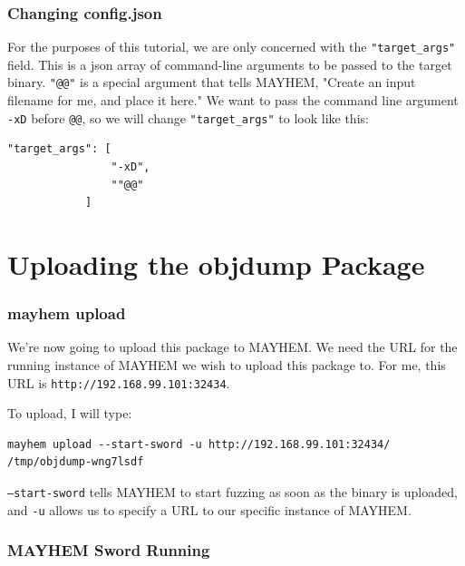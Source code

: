 \documentclass{beamer}
\begin{document}
\begin{frame}[fragile]
\frametitle{Changing config.json}
For the purposes of this tutorial, we are only concerned with the \texttt{"target\_args"} field. This is a json array of command-line arguments to be passed to the target binary. \texttt{"@@"} is a special argument that tells MAYHEM, "Create an input filename for me, and place it here." We want to pass the command line argument \texttt{-xD} before \texttt{@@}, so we will change \texttt{"target\_args"} to look like this:

\begin{lstlisting}[basicstyle=\tiny]
            "target_args": [
                "-xD",
                ""@@"
            ]
\end{lstlisting}
\end{frame}

\section{Uploading the objdump Package}

\begin{frame}[fragile]
\frametitle{mayhem upload}
We're now going to upload this package to MAYHEM. We need the URL for the running instance of MAYHEM we wish to upload this package to. For me, this URL is \texttt{http://192.168.99.101:32434}.

To upload, I will type:

\begin{lstlisting}[basicstyle=\tiny]
    mayhem upload --start-sword -u http://192.168.99.101:32434/ /tmp/objdump-wng7lsdf
\end{lstlisting}

\texttt{--start-sword} tells MAYHEM to start fuzzing as soon as the binary is uploaded, and \texttt{-u} allows us to specify a URL to our specific instance of MAYHEM.
\end{frame}

\begin{frame}
\frametitle{MAYHEM Sword Running}
\end{frame}
\end{document}
